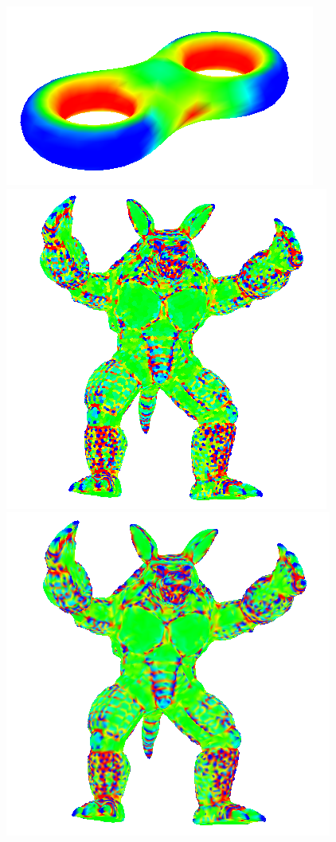 \begin{figure}[!h]
    \endminipage\hfill
    \centering
    \includegraphics[scale=0.7]{images/gci-eight.png}
    \endminipage\hfill
    \centering
    \includegraphics[scale=0.7]{images/gc-armadillo.png}
    \endminipage\hfill
    \centering
    \includegraphics[scale=0.7]{images/gci-armadillo.png}

\end{figure}
